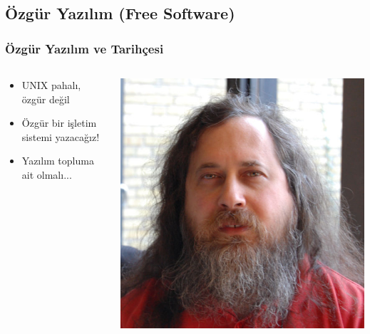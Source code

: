 \documentclass{beamer}
\begin{document}
	\subsection{Özgür Yazılım (Free Software)}
		\begin{frame}
			\frametitle{Özgür Yazılım ve Tarihçesi}
			\begin{columns}
			\begin{column}[l]{5cm}
				\begin{itemize}
				\item UNIX pahalı, özgür değil
				\item Özgür bir işletim sistemi yazacağız!
				\item Yazılım topluma ait olmalı...
				\end{itemize}
			\end{column}
			\begin{column}[r]{5cm}
			\includegraphics{richard}
			\end{column}
			\end{columns}
			
		\end{frame}
		
\end{document}
